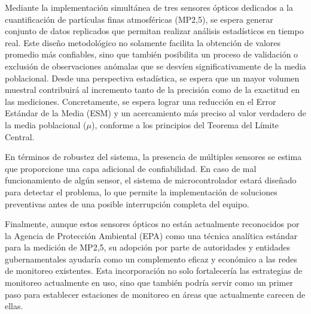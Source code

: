 %
%
Mediante la implementación simultánea de tres sensores ópticos dedicados a la cuantificación de partículas finas atmosféricas (MP2,5), se espera generar conjunto de datos replicados que permitan realizar análisis estadísticos en tiempo real. Este diseño metodológico no solamente facilita la obtención de valores promedio más confiables, sino que también posibilita un proceso de validación o exclusión de observaciones anómalas que se desvíen significativamente de la media poblacional. Desde una perspectiva estadística, se espera que un mayor volumen muestral contribuirá al incremento tanto de la precisión como de la exactitud en las mediciones. Concretamente, se espera lograr una reducción en el Error Estándar de la Media (ESM) y un acercamiento más preciso al valor verdadero de la media poblacional ($\mu$), conforme a los principios del Teorema del Límite Central.

En términos de robustez del sistema, la presencia de múltiples sensores se estima que proporcione una capa adicional de confiabilidad. En caso de mal funcionamiento de algún sensor, el sistema de microcontrolador estará diseñado para detectar el problema, lo que permite la implementación de soluciones preventivas antes de una posible interrupción completa del equipo.

Finalmente, aunque estos sensores ópticos no están actualmente reconocidos por la Agencia de Protección Ambiental (EPA) como una técnica analítica estándar para la medición de MP2,5, su adopción por parte de autoridades y entidades gubernamentales ayudaría como un complemento eficaz y económico a las redes de monitoreo existentes. Esta incorporación no solo fortalecería las estrategias de monitoreo actualmente en uso, sino que también podría servir como un primer paso para establecer estaciones de monitoreo en áreas que actualmente carecen de ellas.


